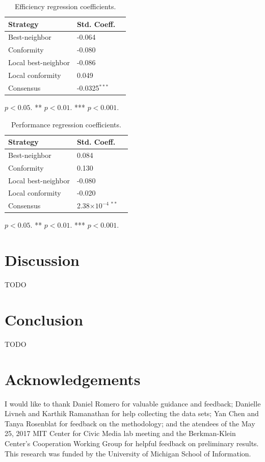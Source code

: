 \documentclass[10pt,twocolumn]{article}
\newcommand{\+}{\phantom{-}}
\begin{document}
\begin{table}
\small
\caption{
Efficiency regression coefficients.
\label{tab:sim-eff}
}
\centering
\bigskip
\begin{tabular}{llc}
\hline
Strategy & Std. Coeff. \\
\hline
Best-neighbor       & -0.064 \\
Conformity          & -0.080 \\
Local best-neighbor & -0.086 \\
Local conformity    & \+0.049 \\
Consensus           & -0.0325$^{***}$ \\
\hline
\end{tabular}
\begin{tablenotes}
\item \centering * $p < 0.05$. ** $p < 0.01$. *** $p < 0.001$.
\end{tablenotes}
\end{table}

\begin{table}
\small
\caption{
Performance regression coefficients.
\label{tab:sim-perf}
}
\centering
\bigskip
\begin{tabular}{llc}
\hline
Strategy & Std. Coeff. \\
\hline
Best-neighbor       & \+0.084 \\
Conformity          & \+0.130 \\
Local best-neighbor & -0.080 \\
Local conformity    & -0.020 \\
Consensus           & \+2.38$\times{10^{-4\;**}}$ \\
\hline
\end{tabular}
\begin{tablenotes}
\item \centering * $p < 0.05$. ** $p < 0.01$. *** $p < 0.001$.
\end{tablenotes}
\end{table}

\section{Discussion}
TODO

\section{Conclusion}
TODO

\section{Acknowledgements}
I would like to thank Daniel Romero for valuable guidance and feedback;
Danielle Livneh and Karthik Ramanathan for help collecting the data sets;
Yan Chen and Tanya Rosenblat for feedback on the methodology;
and the atendees of the May 25, 2017 MIT Center for Civic Media lab meeting and
the Berkman-Klein Center's Cooperation Working Group for helpful feedback on
preliminary results.
This research was funded by the University of Michigan School of Information.

%



 
\end{document}
